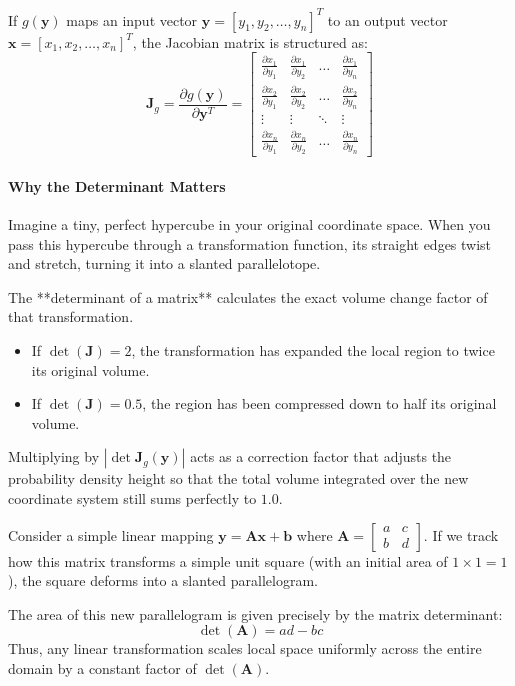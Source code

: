 \documentclass{article}
\begin{document}
If $g(\mathbf{y})$ maps an input vector $\mathbf{y} = [y_1, y_2, \dots, y_n]^T$ to an output vector $\mathbf{x} = [x_1, x_2, \dots, x_n]^T$, the Jacobian matrix is structured as:
\begin{equation*}
\mathbf{J}_g = \frac{\partial g(\mathbf{y})}{\partial \mathbf{y}^T} = 
\begin{bmatrix}
\frac{\partial x_1}{\partial y_1} & \frac{\partial x_1}{\partial y_2} & \dots & \frac{\partial x_1}{\partial y_n} \\
\frac{\partial x_2}{\partial y_1} & \frac{\partial x_2}{\partial y_2} & \dots & \frac{\partial x_2}{\partial y_n} \\
\vdots & \vdots & \ddots & \vdots \\
\frac{\partial x_n}{\partial y_1} & \frac{\partial x_n}{\partial y_2} & \dots & \frac{\partial x_n}{\partial y_n}
\end{bmatrix}
\end{equation*}

\paragraph{Why the Determinant Matters}
Imagine a tiny, perfect hypercube in your original coordinate space. When you pass this hypercube through a transformation function, its straight edges twist and stretch, turning it into a slanted parallelotope. 

The **determinant of a matrix** calculates the exact volume change factor of that transformation. 
\begin{itemize}
    \item If $\det(\mathbf{J}) = 2$, the transformation has expanded the local region to twice its original volume.
    \item If $\det(\mathbf{J}) = 0.5$, the region has been compressed down to half its original volume.
\end{itemize}
Multiplying by $\left| \det \mathbf{J}_g(\mathbf{y}) \right|$ acts as a correction factor that adjusts the probability density height so that the total volume integrated over the new coordinate system still sums perfectly to $1.0$.

\begin{tcolorbox}[colback=blue!5!white, colframe=blue!60!black, title=Geometric Example: 2D Affine Expansion]
Consider a simple linear mapping $\mathbf{y} = \mathbf{A}\mathbf{x} + \mathbf{b}$ where $\mathbf{A} = \begin{bmatrix} a & c \\ b & d \end{bmatrix}$. If we track how this matrix transforms a simple unit square (with an initial area of $1 \times 1 = 1$), the square deforms into a slanted parallelogram. 

The area of this new parallelogram is given precisely by the matrix determinant:
\begin{equation*}
\det(\mathbf{A}) = ad - bc
\end{equation*}
Thus, any linear transformation scales local space uniformly across the entire domain by a constant factor of $\det(\mathbf{A})$.
\end{tcolorbox}
\end{document}
